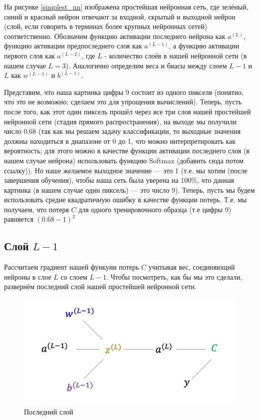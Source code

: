 \documentclass[a4paper, 10pt, openany]{book} %
\begin{document}
	На рисунке \ref{simplest_nn} изображена простейшая нейронная сеть, где зелёный, синий и красный нейрон отвечают за входной, скрытый и выходной нейрон (слой, если говорить в терминах более крупных нейронных сетей) соответственно. Обозначим функцию активации последнего нейрона как $a^{(L)}$, функцию активации предпоследнего слоя как $a^{(L-1)}$, а функцию активации первого слоя как $a^{(L-2)}$, где $L$ - количество слоёв в нашей нейронной сети (в нашем случае $L=3$). Аналогично определим веса и биасы между слоем $L-1$ и $L$ как $w^{(L-1)}$ и $b^{(L-1)}$.
	
	Представим, что наша картинка цифры $9$ состоит из одного пикселя (понятно, что это не возможно; сделаем это для упрощения вычислений). Теперь, пусть после того, как этот один пиксель прошёл через все три слоя нашей простейшей нейронной сети (стадия прямого распространения), на выходе мы получили число 0.68 (так как мы решаем задачу классификации, то выходные значения должны находиться в диапазоне от 0 до 1, что можно интерпретировать как вероятность; для этого можно в качестве функции активации последнего слоя (в нашем случае нейрона) использовать функцию Softmax (добавить сюда потом ссылку)). Но наше желаемое выходное значение --- это 1 (т.е. мы хотим (после завершения обучения), чтобы наша сеть была уверена на 100\%, что данная картинка (в нашем случае один пиксель) --- это число 9). Теперь, пусть мы будем использовать средне квадратичную ошибку в качестве функции потерь. Т.е. мы получаем, что потеря $C$ для одного тренировочного образца (т.е цифры 9) равняется $(0.68-1)^2$
	
	\subsection{Слой $L-1$}
	
	Рассчитаем градиент нашей функуии потерь $C$ учитывая вес, соединяющий нейроны в слое $L$ со слоем $L-1$. Чтобы посмотреть, как бы мы это сделали, развернём последний слой нашей простейшей нейронной сети.
	
	\begin{figure}[h!]
		\centering
		\includegraphics[width=\linewidth]{pictures/backpropagation/last_layer.png}
		\caption{Последний слой}
		\label{last_layer}
	\end{figure}
	
\end{document}
